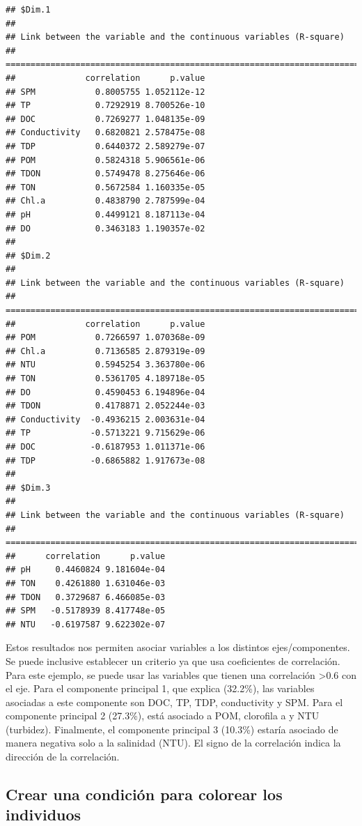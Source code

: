 \documentclass[
]{book}
\begin{document}
\begin{verbatim}
## $Dim.1
## 
## Link between the variable and the continuous variables (R-square)
## =================================================================================
##              correlation      p.value
## SPM            0.8005755 1.052112e-12
## TP             0.7292919 8.700526e-10
## DOC            0.7269277 1.048135e-09
## Conductivity   0.6820821 2.578475e-08
## TDP            0.6440372 2.589279e-07
## POM            0.5824318 5.906561e-06
## TDON           0.5749478 8.275646e-06
## TON            0.5672584 1.160335e-05
## Chl.a          0.4838790 2.787599e-04
## pH             0.4499121 8.187113e-04
## DO             0.3463183 1.190357e-02
## 
## $Dim.2
## 
## Link between the variable and the continuous variables (R-square)
## =================================================================================
##              correlation      p.value
## POM            0.7266597 1.070368e-09
## Chl.a          0.7136585 2.879319e-09
## NTU            0.5945254 3.363780e-06
## TON            0.5361705 4.189718e-05
## DO             0.4590453 6.194896e-04
## TDON           0.4178871 2.052244e-03
## Conductivity  -0.4936215 2.003631e-04
## TP            -0.5713221 9.715629e-06
## DOC           -0.6187953 1.011371e-06
## TDP           -0.6865882 1.917673e-08
## 
## $Dim.3
## 
## Link between the variable and the continuous variables (R-square)
## =================================================================================
##      correlation      p.value
## pH     0.4460824 9.181604e-04
## TON    0.4261880 1.631046e-03
## TDON   0.3729687 6.466085e-03
## SPM   -0.5178939 8.417748e-05
## NTU   -0.6197587 9.622302e-07
\end{verbatim}

Estos resultados nos permiten asociar variables a los distintos ejes/componentes. Se puede inclusive establecer un criterio ya que usa coeficientes de correlación. Para este ejemplo, se puede usar las variables que tienen una correlación \textgreater0.6 con el eje. Para el componente principal 1, que explica (32.2\%), las variables asociadas a este componente son DOC, TP, TDP, conductivity y SPM. Para el componente principal 2 (27.3\%), está asociado a POM, clorofila a y NTU (turbidez). Finalmente, el componente principal 3 (10.3\%) estaría asociado de manera negativa solo a la salinidad (NTU). El signo de la correlación indica la dirección de la correlación.

\hypertarget{crear-una-condiciuxf3n-para-colorear-los-individuos}{%
\subsection{Crear una condición para colorear los individuos}\label{crear-una-condiciuxf3n-para-colorear-los-individuos}}
\end{document}

